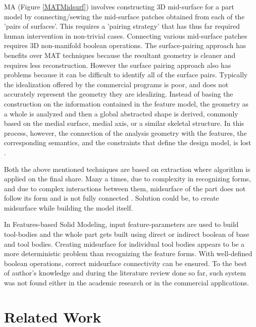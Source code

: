 MA (Figure \ref{MATMidsurf}) involves constructing 3D mid-surface for a part model by connecting/sewing the mid-surface patches obtained from each of the 'pairs of surfaces'. This requires a 'pairing strategy' that has thus far required human intervention in non-trivial cases. Connecting various mid-surface patches requires 3D non-manifold boolean operations. The surface-pairing approach has benefits over MAT techniques because the resultant geometry is cleaner and requires less reconstruction. However the surface pairing approach also has problems because it can be difficult to identify all of the surface pairs. Typically the idealization offered by the commercial programs is poor, and does not accurately represent the geometry they are idealizing\cite{Robinson2006}. Instead of basing the construction on the information contained in the feature model, the geometry as a whole is analyzed and then a global abstracted shape is derived, commonly based on the medial surface, medial axis, or a similar skeletal structure.  In this process, however, the connection of the analysis geometry with the features, the corresponding semantics, and the constraints that define the design model, is lost \cite{Smit2011}.

Both the above mentioned techniques are based on extraction where algorithm is applied on the final share. Many a times, due to complexity in recognizing forms, and due to complex interactions between them, midsurface of the part does not follow its form and is not fully connected \cite{Jxcad,Sheen2008} . Solution could be, to create midsurface while building the model itself.

In Features-based Solid Modeling, input feature-parameters are used to build tool-bodies and the whole part gets built using direct or indirect boolean of base and tool bodies. Creating midsurface for individual tool bodies appears to be a more deterministic problem than recognizing the feature forms. With well-defined boolean operations, correct midsurface connectivity can be ensured.  To the best of author's knowledge and during the literature review done so far, such system was not found either in the academic research or in the commercial applications.


\section{Related Work}

